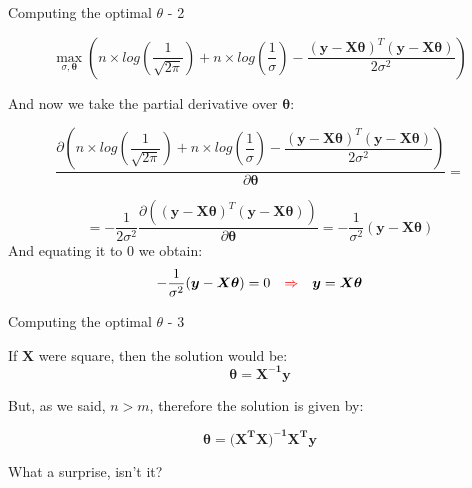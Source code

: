 \documentclass{beamer}
\begin{document}
\begin{frame}
{\centerline{Computing the optimal $\theta$ - 2}}

$$\max_{\sigma, \boldsymbol{\theta}} \left( n \times log \left (\dfrac 1 {\sqrt{2 \pi} } \right ) + n \times log \left (\dfrac 1 {\sigma } \right ) -\dfrac { (\boldsymbol{y} - \boldsymbol{X\theta})^T (\boldsymbol{y} - \boldsymbol{X\theta})} {2 \sigma^2} \right )$$

And now we take the partial derivative over $\boldsymbol{\theta}$:

$$\frac{\partial \left( n \times log \left (\dfrac 1 {\sqrt{2 \pi} } \right ) + n \times log \left (\dfrac 1 {\sigma } \right ) -\dfrac { (\boldsymbol{y} - \boldsymbol{X\theta})^T (\boldsymbol{y} - \boldsymbol{X\theta})} {2 \sigma^2} \right )} {\partial \boldsymbol{\theta}} = $$

$$= - \frac 1 {2 \sigma^2} \frac{\partial \left( { (\boldsymbol{y} - \boldsymbol{X\theta})^T (\boldsymbol{y} - \boldsymbol{X\theta})} \right )} {\partial \boldsymbol{\theta}} =  - \frac 1 {\sigma^2}  { (\boldsymbol{y} - \boldsymbol{X\theta})}  $$
And equating it to 0 we obtain:
$$ - \frac 1 {\sigma^2}  { (\boldsymbol{y} - \boldsymbol{X\theta})} = 0
~~~\textcolor{red}{\Rightarrow}~~~
\boldsymbol{y} = \boldsymbol{X\theta}
$$



\end{frame}

\begin{frame}
{\centerline{Computing the optimal $\theta$ - 3}}

If $\boldsymbol{X}$ were square, then the solution would be:
$$ \boldsymbol{\theta} = \boldsymbol{X^{-1}y}$$

But, as we said, $n > m$, therefore the solution is given by:

$$ \boldsymbol{\theta} = \boldsymbol{{(X^{T}X})^{-1}X^{T}y}$$

\vspace{2cm}

What a surprise, isn't it?
\end{frame}
\end{document}
